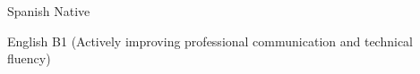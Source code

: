 
\begin{cvskills}

\cvskill
{Spanish}
{Native}

\cvskill
{English}
{B1 (Actively improving professional communication and technical fluency)}

\end{cvskills}